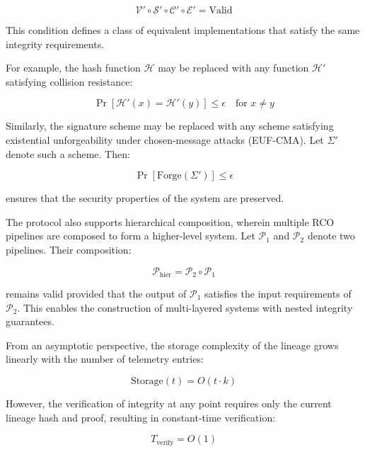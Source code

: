 \begin{equation}
\mathcal{V}' \circ \mathcal{S}' \circ \mathcal{C}' \circ \mathcal{E}' = \text{Valid}
\end{equation}

This condition defines a class of equivalent implementations that satisfy the same integrity requirements.

For example, the hash function $\mathcal{H}$ may be replaced with any function $\mathcal{H}'$ satisfying collision resistance:

\begin{equation}
\Pr[\mathcal{H}'(x) = \mathcal{H}'(y)] \leq \epsilon \quad \text{for } x \neq y
\end{equation}

Similarly, the signature scheme may be replaced with any scheme satisfying existential unforgeability under chosen-message attacks (EUF-CMA). Let $\Sigma'$ denote such a scheme. Then:

\begin{equation}
\Pr[\text{Forge}(\Sigma')] \leq \epsilon
\end{equation}

ensures that the security properties of the system are preserved.

The protocol also supports hierarchical composition, wherein multiple RCO pipelines are composed to form a higher-level system. Let $\mathcal{P}_1$ and $\mathcal{P}_2$ denote two pipelines. Their composition:

\begin{equation}
\mathcal{P}_{\text{hier}} = \mathcal{P}_2 \circ \mathcal{P}_1
\end{equation}

remains valid provided that the output of $\mathcal{P}_1$ satisfies the input requirements of $\mathcal{P}_2$. This enables the construction of multi-layered systems with nested integrity guarantees.

From an asymptotic perspective, the storage complexity of the lineage grows linearly with the number of telemetry entries:

\begin{equation}
\text{Storage}(t) = O(t \cdot k)
\end{equation}

However, the verification of integrity at any point requires only the current lineage hash and proof, resulting in constant-time verification:

\begin{equation}
T_{\text{verify}} = O(1)
\end{equation}


